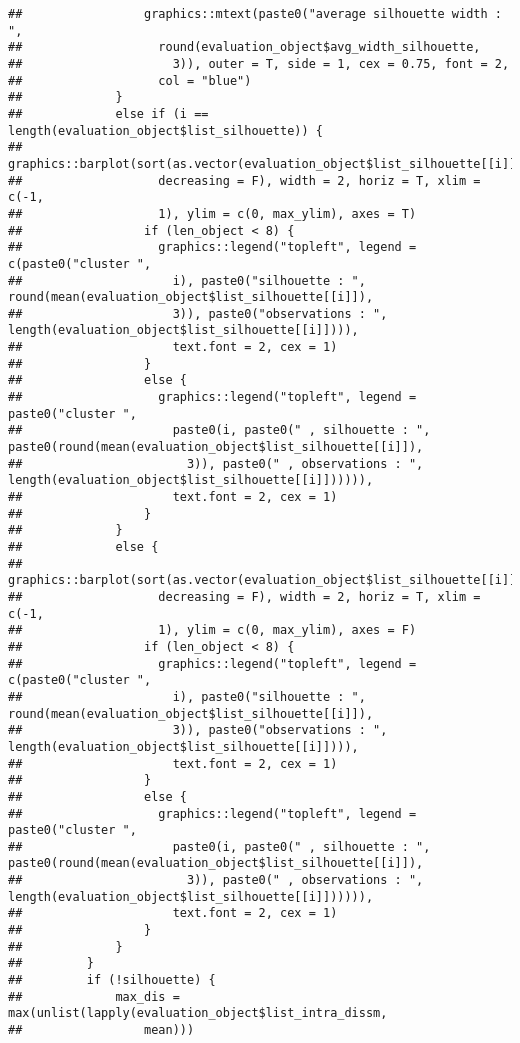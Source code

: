 \documentclass[
]{article}
\begin{document}
\begin{verbatim}
##                 graphics::mtext(paste0("average silhouette width : ", 
##                   round(evaluation_object$avg_width_silhouette, 
##                     3)), outer = T, side = 1, cex = 0.75, font = 2, 
##                   col = "blue")
##             }
##             else if (i == length(evaluation_object$list_silhouette)) {
##                 graphics::barplot(sort(as.vector(evaluation_object$list_silhouette[[i]]), 
##                   decreasing = F), width = 2, horiz = T, xlim = c(-1, 
##                   1), ylim = c(0, max_ylim), axes = T)
##                 if (len_object < 8) {
##                   graphics::legend("topleft", legend = c(paste0("cluster ", 
##                     i), paste0("silhouette : ", round(mean(evaluation_object$list_silhouette[[i]]), 
##                     3)), paste0("observations : ", length(evaluation_object$list_silhouette[[i]]))), 
##                     text.font = 2, cex = 1)
##                 }
##                 else {
##                   graphics::legend("topleft", legend = paste0("cluster ", 
##                     paste0(i, paste0(" , silhouette : ", paste0(round(mean(evaluation_object$list_silhouette[[i]]), 
##                       3)), paste0(" , observations : ", length(evaluation_object$list_silhouette[[i]]))))), 
##                     text.font = 2, cex = 1)
##                 }
##             }
##             else {
##                 graphics::barplot(sort(as.vector(evaluation_object$list_silhouette[[i]]), 
##                   decreasing = F), width = 2, horiz = T, xlim = c(-1, 
##                   1), ylim = c(0, max_ylim), axes = F)
##                 if (len_object < 8) {
##                   graphics::legend("topleft", legend = c(paste0("cluster ", 
##                     i), paste0("silhouette : ", round(mean(evaluation_object$list_silhouette[[i]]), 
##                     3)), paste0("observations : ", length(evaluation_object$list_silhouette[[i]]))), 
##                     text.font = 2, cex = 1)
##                 }
##                 else {
##                   graphics::legend("topleft", legend = paste0("cluster ", 
##                     paste0(i, paste0(" , silhouette : ", paste0(round(mean(evaluation_object$list_silhouette[[i]]), 
##                       3)), paste0(" , observations : ", length(evaluation_object$list_silhouette[[i]]))))), 
##                     text.font = 2, cex = 1)
##                 }
##             }
##         }
##         if (!silhouette) {
##             max_dis = max(unlist(lapply(evaluation_object$list_intra_dissm, 
##                 mean)))

\end{verbatim}
\end{document}
